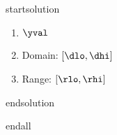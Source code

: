 startsolution
\item \begin{enumerate}
\item $\yval$
\item Domain: $[\dlo,\dhi]$
\item Range: $[\rlo,\rhi]$
\end{enumerate}
endsolution

endall
